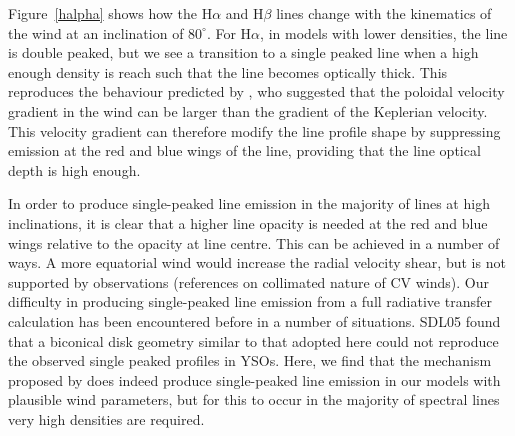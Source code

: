 \documentclass[preprint, a4paper, 11pt]{aastex}
\begin{document}


Figure~\ref{halpha} shows how the H$\alpha$ and H$\beta$ lines change with the kinematics 
of the wind at an inclination of $80^\circ$. For H$\alpha$, in models with lower densities, the
line is double peaked, but we see a transition to a single peaked line when 
a high enough density is reach such that the line becomes optically thick.
This reproduces the behaviour predicted by \cite{MC96}, who suggested that
the poloidal velocity gradient in the wind can be larger than the gradient of 
the Keplerian velocity. This velocity gradient can therefore modify the line profile shape
by suppressing emission at the red and blue wings of the line, 
providing that the line optical depth is high enough.

In order to produce single-peaked line emission in the majority of lines at high inclinations,
it is clear that a higher line opacity is needed at the red and blue wings relative to
the opacity at line centre. This can be achieved in a number of ways. A more equatorial 
wind would increase the radial velocity shear, but is not supported by observations (references 
on collimated nature of CV winds).
Our difficulty in producing single-peaked line emission from a full 
radiative transfer calculation has been encountered before in a number of situations. 
SDL05 found that a biconical disk geometry similar to that adopted here could not reproduce 
the observed single peaked profiles in YSOs. 
Here, we find
that the mechanism proposed by \cite{MC96} does indeed produce 
single-peaked line emission in our models with plausible wind parameters, 
but for this to occur in the majority of
spectral lines very high densities are required.   
\end{document}
